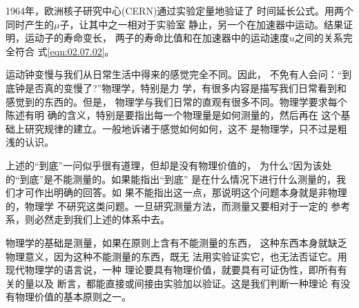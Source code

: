 1964年，欧洲核子研究中心(CERN)通过实验定量地验证了
时间延长公式。用两个同时产生的$\mu$子，让其中之一相对于实验室
静止，另一个在加速器中运动。结果证明，运动子的寿命变长，
两子的寿命比值和在加速器中的运动速度$u$之间的关系完全符合
式\eqref{eqn:02.07.02}。

运动钟变慢与我们从日常生活中得来的感觉完全不同。因此，
不免有人会问：“到底钟是否真的变慢了?”物理学，特别是力
学，有很多内容是描写我们日常看到和感觉到的东西的。但是，
物理学与我们日常的直观有很多不同。物理学要求每个陈述有明
确的含义，特别是要指出每一个物理量是如何测量的，然后再在
这个基础上研究规律的建立。一般地诉诸于感觉如何如何，这不
是物理学，只不过是粗浅的认识。

上述的“到底”一问似乎很有道理，但却是没有物理价值的，
为什么?因为该处的“到底”是不能测量的。如果能指出“到底”
是在什么情况下进行什么测量的，我们才可作出明确的回答。如
果不能指出这一点，那说明这个问题本身就是非物理的，物理学
不研究这类问题。一旦研究测量方法，而测量又要相对于一定的
参考系，则必然走到我们上述的体系中去。

物理学的基础是测量，如果在原则上含有不能测量的东西，
这种东西本身就缺乏物理意义，因为这种不能测量的东西，既无
法用实验证实它，也无法否证它。用现代物理学的语言说，一种
理论要具有物理价值，就要具有可证伪性，即所有有关的量以及
断言，都能直接或间接由实验加以验证。这是我们判断一种理论
有没有物理价值的基本原则之一。